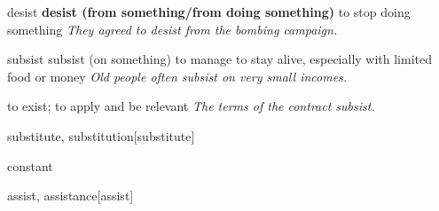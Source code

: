 \begin{DefWord}{desist}
    \textbf{desist (from something/from doing something)} to stop doing something
    \textit{They agreed to desist from the bombing campaign.}
\end{DefWord}

\begin{DefWord}{subsist}
    subsist (on something) to manage to stay alive, especially with limited food or money
    \textit{Old people often subsist on very small incomes.}

    to exist; to apply and be relevant
    \textit{The terms of the contract subsist.}
\end{DefWord}

\begin{DefWord}{substitute, substitution}[substitute]
\end{DefWord}

\begin{DefWord}{constant}
\end{DefWord}

\begin{DefWord}{assist, assistance}[assist]
\end{DefWord}

